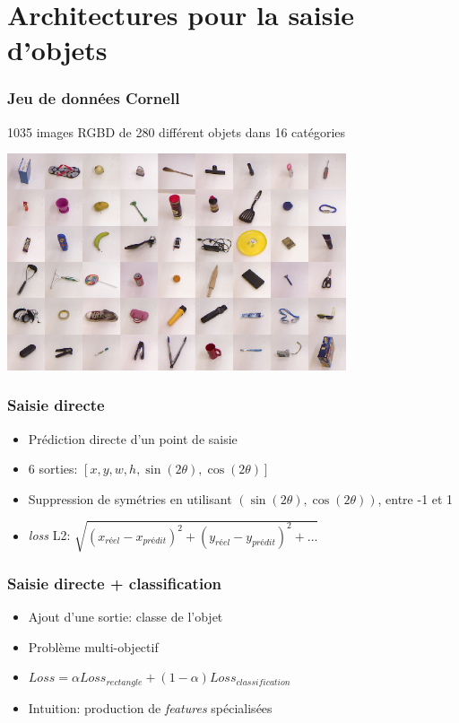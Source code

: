 \documentclass{beamer}
\begin{document}
\section{Architectures pour la saisie d'objets}
\begin{frame}
  \frametitle{Jeu de données Cornell}
  1035 images RGBD de 280 différent objets dans 16 catégories
  \begin{center}
  \includegraphics[width=0.75\textwidth]{img/cornell.png}
  \end{center}
\end{frame}

\begin{frame}
  \frametitle{Saisie directe}
  \begin{itemize}
  \item Prédiction directe d'un point de saisie
  \item 6 sorties: $[x, y, w, h, \sin(2\theta), \cos(2\theta)]$
  \item Suppression de symétries en utilisant $(\sin(2\theta), \cos(2\theta))$,
    entre -1 et 1
  \item \emph{loss} L2: $\sqrt{(x_{réel} - x_{prédit})^2 + (y_{réel} - y_{prédit})^2
    + ...}$
  \end{itemize}
  
\end{frame}

\begin{frame}
  \frametitle{Saisie directe + classification}
  \begin{itemize}
  \item Ajout d'une sortie: classe de l'objet
  \item Problème multi-objectif
  \item $Loss = \alpha Loss_{rectangle} + (1 - \alpha) Loss_{classification}$
  \item Intuition: production de \emph{features} spécialisées
  \end{itemize}
\end{frame}
\end{document}
